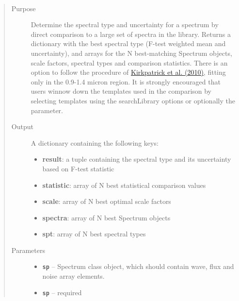 \documentclass[letterpaper,10pt,english]{sphinxmanual}
\begin{document}
\begin{fulllineitems}
\label{api:splat.classifyByTemplate}~\begin{quote}\begin{description}
\item[{Purpose}] \leavevmode
Determine the spectral type and uncertainty for a
spectrum by direct comparison to a large set of spectra in
the library. Returns a dictionary with the best spectral type (F-test weighted mean and
uncertainty), and arrays for the N best-matching Spectrum objects, scale factors, spectral types and comparison statistics.
There is an option to follow the procedure of
\href{http://adsabs.harvard.edu/abs/2010ApJS..190..100K}{Kirkpatrick et al. (2010)},
fitting only in the 0.9-1.4 micron region.
It is strongly encouraged that users winnow down the templates used in the comparison
by selecting templates using the searchLibrary options or optionally the  parameter.

\item[{Output}] \leavevmode
A dictionary containing the following keys:
\begin{itemize}
\item {} 
\textbf{result}: a tuple containing the spectral type and its uncertainty based on F-test statistic

\item {} 
\textbf{statistic}: array of N best statistical comparison values

\item {} 
\textbf{scale}: array of N best optimal scale factors

\item {} 
\textbf{spectra}: array of N best Spectrum objects

\item {} 
\textbf{spt}: array of N best spectral types

\end{itemize}

\item[{Parameters}] \leavevmode\begin{itemize}
\item {} 
\textbf{\texttt{sp}} -- Spectrum class object, which should contain wave, flux and
noise array elements.

\item {} 
\textbf{\texttt{sp}} -- required


\end{itemize}
\end{description}
\end{quote}
\end{fulllineitems}
\end{document}
